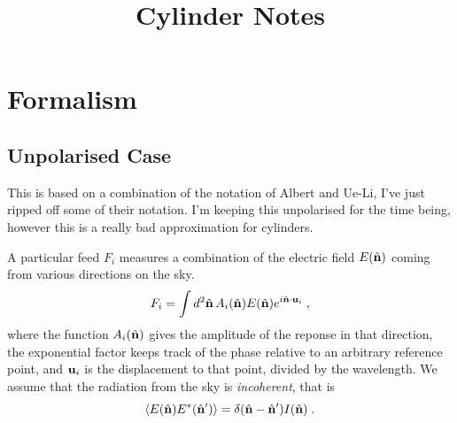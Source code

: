 \documentclass[prd,twocolumn,nofootinbib]{revtex4}
\begin{document}
\title{Cylinder Notes}

\maketitle

\newcommand{\tvis}{\ensuremath{\mathcal{V}}}
\newcommand{\vis}{\ensuremath{V}}



\section{Formalism}

\subsection{Unpolarised Case}

This is based on a combination of the notation of Albert and Ue-Li, I've just
ripped off some of their notation. I'm keeping this unpolarised for the time
being, however this is a really bad approximation for cylinders.

A particular feed $F_i$ measures a combination of the electric field $E(\hat{\mathbf{n}})$
coming from various directions on the sky.
\begin{equation}
F_i = \int d^2\hat{\mathbf{n}} \, A_i(\hat{\mathbf{n}}) E(\hat{\mathbf{n}}) e^{i \hat{\mathbf{n}}\cdot\mathbf{u}_i}\; ,
\end{equation}
where the function $A_i(\hat{\mathbf{n}})$ gives the amplitude of the reponse in that
direction, the exponential factor keeps track of the phase relative to an
arbitrary reference point, and $\mathbf{u}_i$ is the displacement to that point,
divided by the wavelength. We assume that the radiation from the sky is
\emph{incoherent}, that is
\begin{equation}
\left\langle E(\hat{\mathbf{n}}) E^* (\hat{\mathbf{n}}') \right\rangle = \delta(\hat{\mathbf{n}} - \hat{\mathbf{n}}') I(\hat{\mathbf{n}}) \; .
\end{equation}
\end{document}
